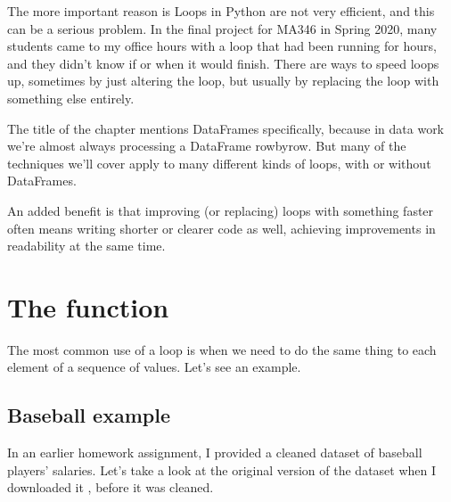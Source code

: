 \documentclass[letterpaper,10pt,english]{jupyterBook}
\begin{document}
\sphinxAtStartPar
The more important reason is   Loops in Python are not very efficient, and this can be a serious problem.  In the final project for MA346 in Spring 2020, many students came to my office hours with a loop that had been running for hours, and they didn’t know if or when it would finish.  There are  ways to speed loops up, sometimes by just altering the loop, but usually by replacing the loop with something else entirely.

\sphinxAtStartPar
{}

\sphinxAtStartPar
The title of the chapter mentions DataFrames specifically, because in data work we’re almost always processing a DataFrame row\sphinxhyphen{}by\sphinxhyphen{}row.  But many of the techniques we’ll cover apply to many different kinds of loops, with or without DataFrames.

\sphinxAtStartPar
An added benefit is that improving (or replacing) loops with something faster often means writing shorter or clearer code as well, achieving improvements in readability at the same time.


\section{The  function}
\label{\detokenize{chapter-11-processing-rows:the-apply-function}}
\sphinxAtStartPar
The most common use of a loop is when we need to do the same thing to each element of a sequence of values.  Let’s see an example.


\subsection{Baseball example}
\label{\detokenize{chapter-11-processing-rows:baseball-example}}
\sphinxAtStartPar
In an earlier homework assignment, I provided a cleaned dataset of baseball players’ salaries.  Let’s take a look at the original version of the dataset when I downloaded it , before it was cleaned.

\begin{sphinxVerbatim}[commandchars=\\\{\}]
   
    
\end{sphinxVerbatim}
\end{document}
